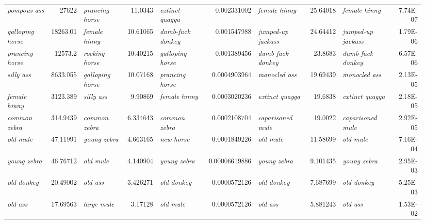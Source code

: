 \begin{sidewaystable}[!htbp]
{\begin{tabular}[t]{lr|lr|lr|lr|lr}
\textit{pompous ass} & \num{27622} & \textit{prancing horse} & \num{11.0343} & \textit{extinct quagga} & \num[round-mode=places,round-precision=6]{0.002331002} & \textit{female hinny} & \num{25.64018} & \textit{female hinny} & 7.74E-07 \\
\textit{galloping horse} & \num{18263.01} & \textit{female hinny} & \num{10.61065} & \textit{dumb-fuck donkey} & \num[round-mode=places,round-precision=6]{0.001547988} & \textit{jumped-up jackass} & \num{24.64412} & \textit{jumped-up jackass} & 1.79E-06 \\
\textit{prancing horse} & \num{12573.2} & \textit{rocking horse} & \num{10.40215} & \textit{galloping horse} & \num[round-mode=places,round-precision=6]{0.001389456} & \textit{dumb-fuck donkey} & \num{23.8683} & \textit{dumb-fuck donkey} & 6.57E-06 \\
\textit{silly ass} & \num{8633.055} & \textit{galloping horse} & \num{10.07168} & \textit{prancing horse} & \num[round-mode=places,round-precision=6]{0.0004903964} & \textit{monocled ass} & \num{19.69439} & \textit{monocled ass} & 2.13E-05 \\
\textit{female hinny} & \num{3123.389} & \textit{silly ass} & \num{9.90869} & \textit{female hinny} & \num[round-mode=places,round-precision=6]{0.0003020236} & \textit{extinct quagga} & \num{19.6838} & \textit{extinct quagga} & 2.18E-05 \\
\textit{common zebra} & \num{314.9439} & \textit{common zebra} & \num{6.334643} & \textit{common zebra} & \num[round-mode=places,round-precision=6]{0.0002108704} & \textit{caparisoned mule} & \num{19.0022} & \textit{caparisoned mule} & 2.92E-05 \\
\textit{old mule} & \num{47.11991} & \textit{young zebra} & \num{4.663165} & \textit{new horse} & \num[round-mode=places,round-precision=6]{0.0001849226} & \textit{old mule} & \num{11.58699} & \textit{old mule} & 7.16E-04 \\
\textit{young zebra} & \num{46.76712} & \textit{old mule} & \num{4.140904} & \textit{young zebra} & \num[round-mode=places,round-precision=6]{0.00006619886} & \textit{young zebra} & \num{9.101435} & \textit{young zebra} & 2.95E-03 \\
\textit{old donkey} & \num{20.49002} & \textit{old ass} & \num{3.426271} & \textit{old donkey} & \num[round-mode=places,round-precision=6]{0.0000572126} & \textit{old donkey} & \num{7.687699} & \textit{old donkey} & 5.25E-03 \\
\textit{old ass} & \num{17.69563} & \textit{large mule} & \num{3.17128} & \textit{old mule} & \num[round-mode=places,round-precision=6]{0.0000572126} & \textit{old ass} & \num{5.881243} & \textit{old ass} & 1.53E-02 \\

\end{tabular}}
\end{sidewaystable}
